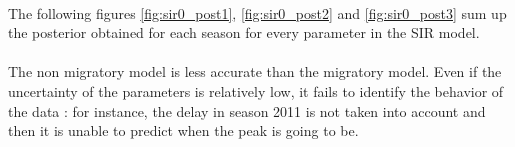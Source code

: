 \documentclass[11pt, a4paper]{article}
\begin{document}
\paragraph{}
The following figures \ref{fig:sir0_post1}, \ref{fig:sir0_post2} and \ref{fig:sir0_post3} sum up the posterior obtained for each season for every parameter in the SIR model.

\paragraph{}
The non migratory model is less accurate than the migratory model. Even if the uncertainty of the parameters is relatively low, it fails to identify the behavior of the data : for instance, the delay in season 2011 is not taken into account and then it is unable to predict when the peak is going to be.
\end{document}
